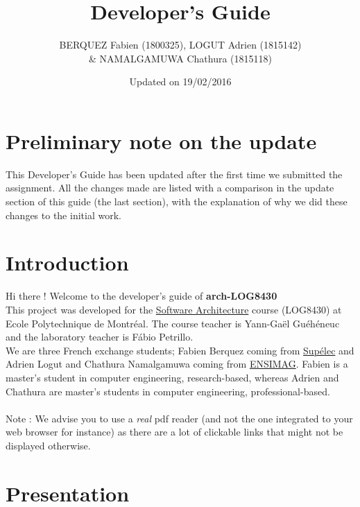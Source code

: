 \documentclass{report}
\title{Developer's Guide}
\author{BERQUEZ Fabien  (1800325), LOGUT Adrien (1815142) \\ \& NAMALGAMUWA Chathura (1815118)}
\date{Updated on 19/02/2016}
\begin{document}
\maketitle

\tableofcontents

\newtoggle{diag}

\toggletrue{diag}

\chapter{Preliminary note on the update}

This Developer's Guide has been updated after the first time we submitted the assignment. All the changes made are listed with a comparison in the update section of this guide (the last section), with the explanation of why we did these changes to the initial work.

\chapter{Introduction}

Hi there ! Welcome to the developer's guide of \textbf{arch-LOG8430} \\

This project was developed for the \href{http://www.polymtl.ca/etudes/cours/details.php?sigle=LOG8430}{Software Architecture} course (LOG8430) at Ecole Polytechnique de Montréal. The course teacher is Yann-Gaël Guéhéneuc and the laboratory teacher is Fábio Petrillo. \\

We are three French exchange students; Fabien Berquez coming from \href{http://www.supelec.fr/374_p_14603/welcome.html}{Supélec} and Adrien Logut and Chathura Namalgamuwa coming from \href{http://ensimag.grenoble-inp.fr/welcome/}{ENSIMAG}. Fabien is a master's student in computer engineering, research-based, whereas Adrien and Chathura are master's students in computer engineering, professional-based. \\ 

\ \\

Note : We advise you to use a \textit{real} pdf reader (and not the one integrated to your web browser for instance) as there are a lot of clickable links that might not be displayed otherwise.
\chapter{Presentation}
\end{document}
